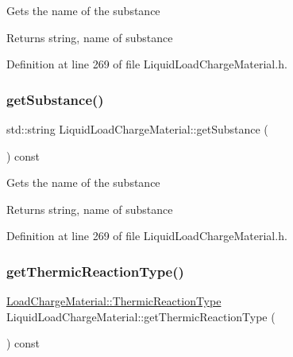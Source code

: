 Gets the name of the substance \begin{DoxyReturn}{Returns}
string, name of substance 
\end{DoxyReturn}


Definition at line 269 of file Liquid\+Load\+Charge\+Material.\+h.

\mbox{\label{class_liquid_load_charge_material_a8f925c04c15ed889ba3fd7c4b628dbff}} 
\subsubsection{\texorpdfstring{get\+Substance()}{getSubstance()}\hspace{0.1cm}{\footnotesize\ttfamily [3/3]}}
{\footnotesize\ttfamily std\+::string Liquid\+Load\+Charge\+Material\+::get\+Substance (\begin{DoxyParamCaption}{ }\end{DoxyParamCaption}) const\hspace{0.3cm}{\ttfamily [inline]}}

Gets the name of the substance \begin{DoxyReturn}{Returns}
string, name of substance 
\end{DoxyReturn}


Definition at line 269 of file Liquid\+Load\+Charge\+Material.\+h.

\mbox{\label{class_liquid_load_charge_material_a181337f5e5cf6a47b82dd56897b49c29}} 
\subsubsection{\texorpdfstring{get\+Thermic\+Reaction\+Type()}{getThermicReactionType()}\hspace{0.1cm}{\footnotesize\ttfamily [1/3]}}
{\footnotesize\ttfamily \hyperlink{namespace_load_charge_material_a51d4263e865a5d86236622dd3fe23fd1}{Load\+Charge\+Material\+::\+Thermic\+Reaction\+Type} Liquid\+Load\+Charge\+Material\+::get\+Thermic\+Reaction\+Type (\begin{DoxyParamCaption}{ }\end{DoxyParamCaption}) const\hspace{0.3cm}{\ttfamily [inline]}}

